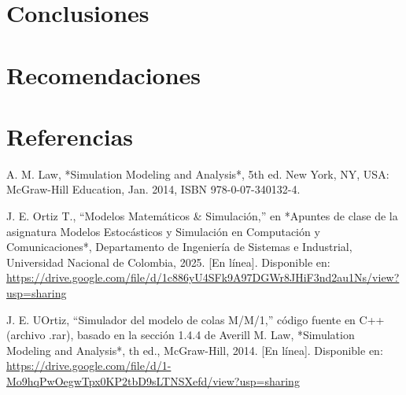 \documentclass{article}
\begin{document}
\section{Conclusiones}\label{sec:concl}



\section{Recomendaciones}\label{secrecomen}





\section{Referencias}
\renewcommand{\refname}{}
\begin{thebibliography}{9}

 \label{ref:modSim} A. M. Law, *Simulation Modeling and Analysis*, 5th ed. 
New York, NY, USA: McGraw-Hill Education, Jan. 2014, ISBN 978-0-07-340132-4. 

 \label{ref:matSim} J. E. Ortiz T., “Modelos Matemáticos \& Simulación,”
 en *Apuntes de clase de la asignatura Modelos Estocásticos y Simulación en 
 Computación y Comunicaciones*, Departamento de Ingeniería de Sistemas e Industrial, 
 Universidad Nacional de Colombia, 2025. [En línea]. Disponible en: 
 \url{https://drive.google.com/file/d/1c886yU4SFk9A97DGWr8JHiF3nd2au1Ns/view?usp=sharing}

  \label{ref:cimColas} J. E. UOrtiz, “Simulador del modelo de colas M/M/1,” 
 código fuente en C++ (archivo .rar), basado en la sección 
 1.4.4 de Averill M. Law, *Simulation Modeling and Analysis*, 
 th ed., McGraw-Hill, 2014. [En línea]. Disponible en: 
 \url{https://drive.google.com/file/d/1-Mo9hqPwOegwTpx0KP2tbD9sLTNSXefd/view?usp=sharing}



\end{thebibliography}
\end{document}
